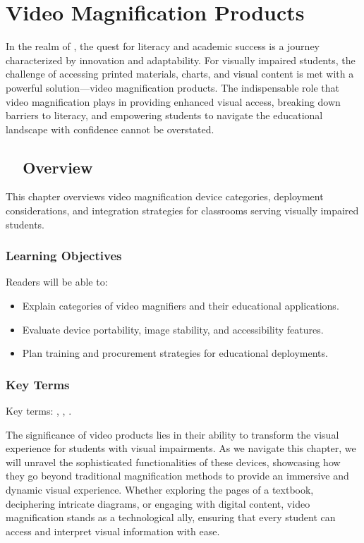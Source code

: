 \chapter{Video Magnification Products}\label{ch6:chap:video-magnification}

\raggedright
In the realm of , the quest for literacy and academic success is a journey characterized by innovation and adaptability. For visually impaired students, the challenge of accessing printed materials, charts, and visual content is met with a powerful solution—video magnification products. The indispensable role that video magnification plays in providing enhanced visual access, breaking down barriers to literacy, and empowering students to navigate the educational landscape with confidence cannot be overstated.\supercite{PerkinsVideoMagnifier, AFBMagnification}

\section{~~Overview}\label{chap6:overview}
This chapter overviews video magnification device categories, deployment considerations, and integration strategies for classrooms serving visually impaired students.

\subsection{Learning Objectives}\label{chap6:learning-objectives}
Readers will be able to:
\begin{itemize}
\item Explain categories of video magnifiers and their educational applications.
\item Evaluate device portability, image stability, and accessibility features.
\item Plan training and procurement strategies for educational deployments.
\end{itemize}

\subsection{Key Terms}\label{chap6:key-terms}
Key terms: , , .

The significance of video  products lies in their ability to transform the visual experience for students with visual impairments. As we navigate this chapter, we will unravel the sophisticated functionalities of these devices, showcasing how they go beyond traditional magnification methods to provide an immersive and dynamic visual experience. Whether exploring the pages of a textbook, deciphering intricate diagrams, or engaging with digital content, video magnification stands as a technological ally, ensuring that every student can access and interpret visual information with ease.

